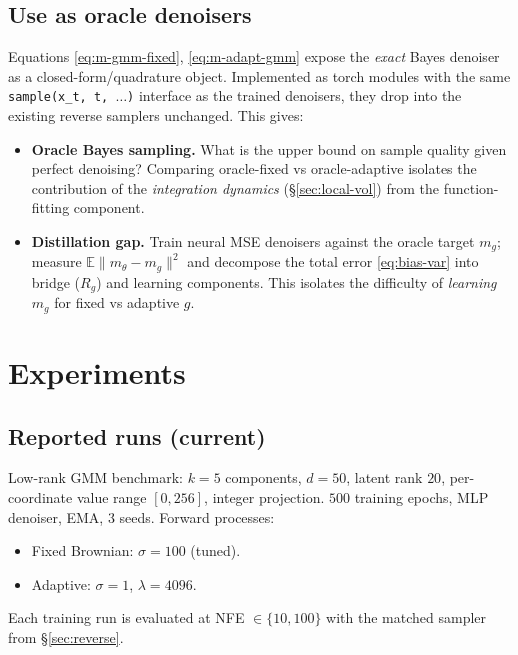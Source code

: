 \documentclass[11pt]{article}
\newcommand{\E}{\mathbb{E}}
\begin{document}
\subsection{Use as oracle denoisers}
\label{sec:oracle}

Equations \eqref{eq:m-gmm-fixed}, \eqref{eq:m-adapt-gmm} expose the
\emph{exact} Bayes denoiser as a closed-form/quadrature object. Implemented
as torch modules with the same \texttt{sample(x\_t, t, $\dots$)} interface
as the trained denoisers, they drop into the existing reverse samplers
unchanged. This gives:
\begin{itemize}
    \item \textbf{Oracle Bayes sampling.} What is the upper bound on
        sample quality given perfect denoising? Comparing oracle-fixed
        vs oracle-adaptive isolates the contribution of the
        \emph{integration dynamics} (\S\ref{sec:local-vol}) from the
        function-fitting component.
    \item \textbf{Distillation gap.} Train neural MSE denoisers against
        the oracle target $m_g$; measure
        $\E\|m_\theta - m_g\|^2$ and decompose the total error
        \eqref{eq:bias-var} into bridge ($R_g$) and learning components.
        This isolates the difficulty of \emph{learning} $m_g$ for fixed
        vs adaptive $g$.
\end{itemize}

\section{Experiments}
\label{sec:exp}

\subsection{Reported runs (current)}

Low-rank GMM benchmark: $k=5$ components, $d=50$, latent rank $20$,
per-coordinate value range $[0,256]$, integer projection. $500$ training
epochs, MLP denoiser, EMA, $3$ seeds. Forward processes:
\begin{itemize}
    \item Fixed Brownian: $\sigma=100$ (tuned).
    \item Adaptive: $\sigma=1$, $\lambda=4096$.
\end{itemize}
Each training run is evaluated at NFE $\in\{10,100\}$ with the matched
sampler from \S\ref{sec:reverse}.
\end{document}

